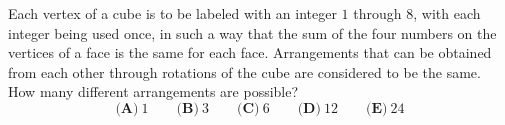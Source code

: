 Each vertex of a cube is to be labeled with an integer $1$ through $8$, with each integer being used once, in such a way that the sum of the four numbers on the vertices of a face is the same for each face. Arrangements that can be obtained from each other through rotations of the cube are considered to be the same. How many different arrangements are possible?
\[\textbf{(A)}\ 1\qquad\textbf{(B)}\ 3\qquad\textbf{(C)}\ 6\qquad\textbf{(D)}\ 12\qquad\textbf{(E)}\ 24\]
